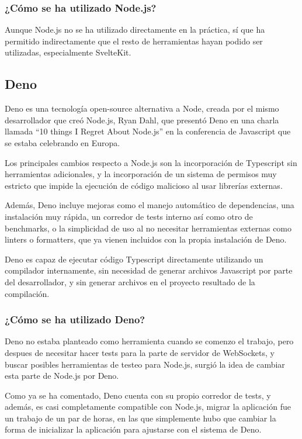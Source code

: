 \subsubsection{¿Cómo se ha utilizado Node.js?}
Aunque Node.js no se ha utilizado directamente en la práctica, sí que ha permitido indirectamente que el resto de herramientas hayan podido ser utilizadas, especialmente SvelteKit.


\subsection{Deno}
Deno \cite{deno_docs} es una tecnología open-source alternativa a Node, creada por el mismo desarrollador que creó Node.js, Ryan Dahl, que presentó Deno en una charla llamada “10 things I Regret About Node.js” en la conferencia de Javascript que se estaba celebrando en Europa.

Los principales cambios respecto a Node.js son la incorporación de Typescript sin herramientas adicionales, y la incorporación de un sistema de permisos muy estricto que impide la ejecución de código malicioso al usar librerías externas.

Además, Deno incluye mejoras como el manejo automático de dependencias, una instalación muy rápida, un corredor de tests interno así como otro de benchmarks, o la simplicidad de uso al no necesitar herramientas externas como linters o formatters, que ya vienen incluidos con la propia instalación de Deno.

Deno es capaz de ejecutar código Typescript directamente utilizando un compilador internamente, sin necesidad de generar archivos Javascript por parte del desarrollador, y sin generar archivos en el proyecto resultado de la compilación.

\subsubsection{¿Cómo se ha utilizado Deno?}
Deno no estaba planteado como herramienta cuando se comenzo el trabajo, pero despues de necesitar hacer tests para la parte de servidor de WebSockets, y buscar posibles herramientas de testeo para Node.js, surgió la idea de cambiar esta parte de Node.js por Deno.

Como ya se ha comentado, Deno cuenta con su propio corredor de tests, y además, es casi completamente compatible con Node.js, migrar la aplicación fue un trabajo de un par de horas, en las que simplemente hubo que cambiar la forma de inicializar la aplicación para ajustarse con el sistema de Deno.

